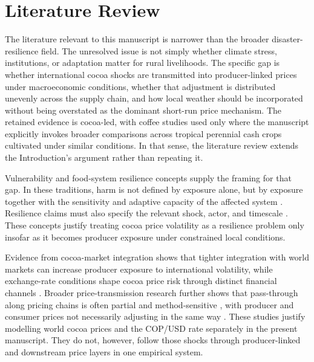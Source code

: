 \section{Literature Review}

The literature relevant to this manuscript is narrower than the broader disaster-resilience field. The unresolved issue is not simply whether climate stress, institutions, or adaptation matter for rural livelihoods. The specific gap is whether international cocoa shocks are transmitted into producer-linked prices under macroeconomic conditions, whether that adjustment is distributed unevenly across the supply chain, and how local weather should be incorporated without being overstated as the dominant short-run price mechanism. The retained evidence is cocoa-led, with coffee studies used only where the manuscript explicitly invokes broader comparisons across tropical perennial cash crops cultivated under similar conditions. In that sense, the literature review extends the Introduction's argument rather than repeating it.

Vulnerability and food-system resilience concepts supply the framing for that gap. In these traditions, harm is not defined by exposure alone, but by exposure together with the sensitivity and adaptive capacity of the affected system \citep{Turner2003,Adger2006}. Resilience claims must also specify the relevant shock, actor, and timescale \citep{Tendall2015,Zurek2022}. These concepts justify treating cocoa price volatility as a resilience problem only insofar as it becomes producer exposure under constrained local conditions.

Evidence from cocoa-market integration shows that tighter integration with world markets can increase producer exposure to international volatility, while exchange-rate conditions shape cocoa price risk through distinct financial channels \citep{TsowouGayi2019,Jumah2001}. Broader price-transmission research further shows that pass-through along pricing chains is often partial and method-sensitive \citep{MeyerCramon2004,acosta_ihle_voncramon_2019}, with producer and consumer prices not necessarily adjusting in the same way \citep{JimenezRodriguez2022}. These studies justify modelling world cocoa prices and the COP/USD rate separately in the present manuscript. They do not, however, follow those shocks through producer-linked and downstream price layers in one empirical system.

